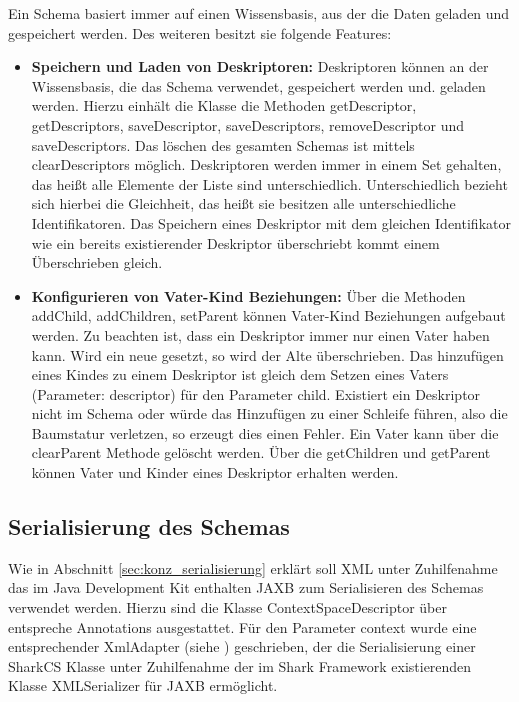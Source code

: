 \documentclass[a4paper]{article}
\begin{document}
	Ein Schema basiert immer auf einen Wissensbasis, aus der die Daten geladen und
	gespeichert werden. Des weiteren besitzt sie folgende Features:
	
	\begin{itemize}
		\item \textbf{Speichern und Laden von Deskriptoren:} Deskriptoren können
		an der Wissensbasis, die das Schema verwendet, gespeichert werden und.
		geladen werden. Hierzu einhält die Klasse die Methoden getDescriptor,
		getDescriptors, saveDescriptor, saveDescriptors, removeDescriptor und
		saveDescriptors. Das löschen des gesamten Schemas ist mittels 
		clearDescriptors möglich. Deskriptoren werden immer in einem Set gehalten,
		das heißt alle Elemente der Liste sind unterschiedlich. Unterschiedlich
		bezieht sich hierbei die Gleichheit, das heißt sie besitzen alle
		unterschiedliche Identifikatoren. Das Speichern eines Deskriptor mit dem
		gleichen Identifikator wie ein bereits existierender Deskriptor
		überschriebt kommt einem Überschrieben gleich.
		\item \textbf{Konfigurieren von Vater-Kind Beziehungen:} Über die Methoden 
		addChild, addChildren, setParent können Vater-Kind Beziehungen aufgebaut
		werden. Zu beachten ist, dass ein Deskriptor immer nur einen Vater
		haben kann. Wird ein neue gesetzt, so wird der Alte überschrieben. Das
		hinzufügen eines Kindes zu einem Deskriptor ist gleich dem Setzen eines 
		Vaters (Parameter: descriptor) für den Parameter child. Existiert ein
		Deskriptor nicht im Schema oder würde das Hinzufügen zu einer
		Schleife führen, also die Baumstatur verletzen, so erzeugt dies einen
		Fehler.	Ein Vater kann über die clearParent Methode gelöscht werden. Über
		die getChildren	und getParent können Vater und Kinder eines Deskriptor
		erhalten werden.
	\end{itemize}
	
	\subsection{Serialisierung des Schemas}
	
	Wie in Abschnitt \ref{sec:konz_serialisierung} erklärt soll XML unter
	Zuhilfenahme das im Java Development Kit enthalten JAXB zum Serialisieren
	des Schemas verwendet werden. Hierzu sind die Klasse ContextSpaceDescriptor
	über entspreche	Annotations ausgestattet. Für den Parameter context wurde
	eine entsprechender XmlAdapter (siehe \cite{XmlAdapter}) geschrieben, der
	die Serialisierung einer SharkCS Klasse unter Zuhilfenahme der im Shark
	Framework existierenden Klasse XMLSerializer für JAXB ermöglicht. \\
	
\end{document}
